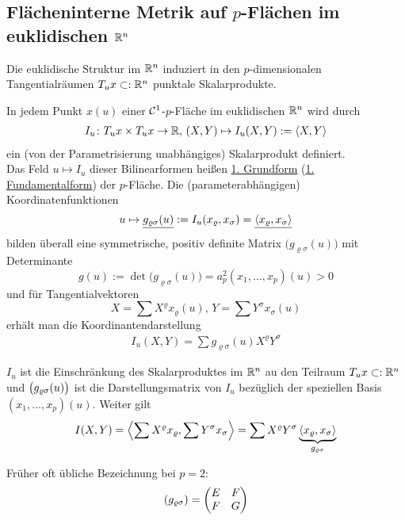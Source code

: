 \subsection{Flächeninterne Metrik auf $p$-Flächen im euklidischen $\mathbb{R}^n$}
Die euklidische Struktur im \(\mathbb{R}^n\) induziert in den \(p\)-dimensionalen Tangentialräumen \(T_u x \subset: \mathbb{R}^n\) punktale Skalarprodukte.

\begin{satz}\label{satz211}
 In jedem Punkt \(x(u)\) einer \(\mathcal{C}^1\)-\(p\)-Fläche im euklidischen \(\mathbb{R}^n\) wird durch
 \begin{align*}
  I_u \colon T_u x \times T_u x \to \mathbb{R}, \, (X,Y) \mapsto I_u (X,Y) := \langle X, Y \rangle
 \end{align*}
ein (von der Parametrisierung unabhängiges) Skalarprodukt definiert. \\
Das Feld \(u \mapsto I_u\) dieser Bilinearformen heißen \uline{1. Grundform} (\uline{1. Fundamentalform}) der \(p\)-Fläche. Die (parameterabhängigen) Koordinatenfunktionen
\[
 u \mapsto \uline{g_{\varrho \sigma} (u)} := I_u ( x_\varrho, x_\sigma) = \uline{\langle x_\varrho, x_\sigma \rangle}
\]
bilden überall eine symmetrische, positiv definite Matrix \(\big(g_{\varrho \sigma}(u)\big)\) mit Determinante
\[
 g(u) := \det \big(g_{\varrho \sigma}(u)\big) = a_p^2 (x_1, \dots, x_p)(u) > 0
\]
und für Tangentialvektoren
\[
 X = \sum X^\varrho x_\varrho (u), \, Y = \sum Y^\sigma x_\sigma(u)
\]
erhält man die Koordinantendarstellung
\begin{align*}
I_u (X,Y) = \sum g_{\varrho \sigma}(u) X^\varrho Y^\sigma
\end{align*}
\end{satz}

\begin{beweis}
 \(I_u\) ist die Einschränkung des Skalarproduktes im \(\mathbb{R}^n\) au den Teilraum \(T_u x \subset: \mathbb{R}^n\) und \(\big(g_{\varrho \sigma}(u)\big)\) ist die Darstellungsmatrix von \(I_u\) bezüglich der speziellen Basis \((x_1, \dots, x_p)(u)\). Weiter gilt
 \[
  I( X,Y) = \left\langle\sum X^\varrho x_\varrho, \sum Y^\sigma x_\sigma \right\rangle = \sum X^\varrho Y^\sigma \underbrace{\langle x_\varrho, x_\sigma\rangle}_{g_{\varrho \sigma}}
 \]
\end{beweis}
 Früher oft übliche Bezeichnung bei \(p = 2\):
 \begin{align*}
  (g_{\varrho \sigma}) = \begin{pmatrix}
            E & F \\
            F & G
           \end{pmatrix}
 \end{align*}
